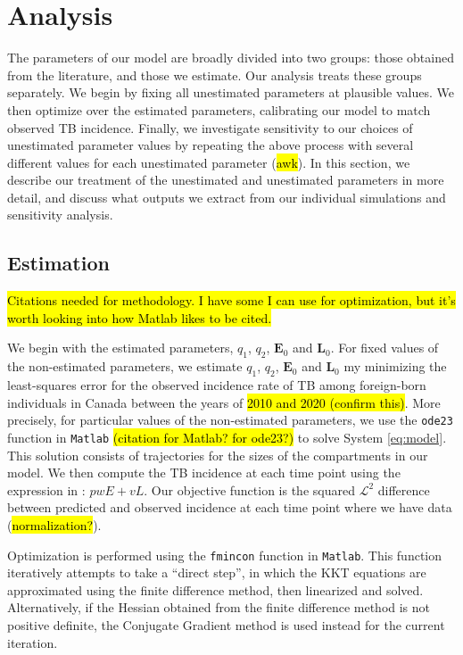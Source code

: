 \documentclass[sn-mathphys,Numbered]{sn-jnl}%
\newcommand{\cE}{\mathbf{E}}
\newcommand{\cL}{\mathbf{L}}
\theoremstyle{thmstyleone}%
\theoremstyle{thmstyletwo}%
\theoremstyle{thmstylethree}%
\begin{document}
\section{Analysis}

The parameters of our model are broadly divided into two groups: those obtained from the literature, and those we estimate. Our analysis treats these groups separately. We begin by fixing all unestimated parameters at plausible values. We then optimize over the estimated parameters, calibrating our model to match observed TB incidence. Finally, we investigate sensitivity to our choices of unestimated parameter values by repeating the above process with several different values for each unestimated parameter (\hl{awk}). In this section, we describe our treatment of the unestimated and unestimated parameters in more detail, and discuss what outputs we extract from our individual simulations and sensitivity analysis.

\subsection{Estimation}
\label{sec:estimation}
\hl{Citations needed for methodology. I have some I can use for optimization, but it's worth looking into how Matlab likes to be cited.}

We begin with the estimated parameters, $q_1$, $q_2$, $\cE_0$ and $\cL_0$. For fixed values of the non-estimated parameters, we estimate $q_1$, $q_2$, $\cE_0$ and $\cL_0$ my minimizing the least-squares error for the observed incidence rate of TB among foreign-born individuals in Canada between the years of \hl{2010 and 2020 (confirm this)}. More precisely, for particular values of the non-estimated parameters, we use the \texttt{ode23} function in \texttt{Matlab} \hl{(citation for Matlab? for ode23?)} to solve System \ref{eq:model}. This solution consists of trajectories for the sizes of the compartments in our model. We then compute the TB incidence at each time point using the expression in \citet{Guo2011PersistentLatency}: $pwE +vL$. Our objective function is the squared $\mathcal{L}^2$ difference between predicted and observed incidence at each time point where we have data (\hl{normalization?}). 

Optimization is performed using the \texttt{fmincon} function in \texttt{Matlab}. This function iteratively attempts to take a ``direct step'', in which the KKT equations are approximated using the finite difference method, then linearized and solved. Alternatively, if the Hessian obtained from the finite difference method is not positive definite, the Conjugate Gradient method is used instead for the current iteration.
\end{document}
